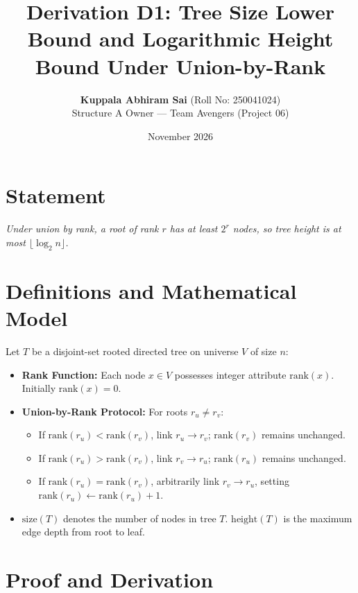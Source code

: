 \documentclass[11pt,a4paper]{article}
\title{\textbf{Derivation D1: Tree Size Lower Bound and Logarithmic Height Bound Under Union-by-Rank}}
\author{\textbf{Kuppala Abhiram Sai} (Roll No: 250041024) \\ Structure A Owner --- Team Avengers (Project 06)}
\date{November 2026}
\begin{document}
\maketitle

\section{Statement}
\textit{Under union by rank, a root of rank $r$ has at least $2^r$ nodes, so tree height is at most $\lfloor \log_2 n \rfloor$.}

\section{Definitions and Mathematical Model}
Let $T$ be a disjoint-set rooted directed tree on universe $V$ of size $n$:
\begin{itemize}
    \item \textbf{Rank Function:} Each node $x \in V$ possesses integer attribute $\text{rank}(x)$. Initially $\text{rank}(x) = 0$.
    \item \textbf{Union-by-Rank Protocol:} For roots $r_u \neq r_v$:
    \begin{itemize}
        \item If $\text{rank}(r_u) < \text{rank}(r_v)$, link $r_u \to r_v$; $\text{rank}(r_v)$ remains unchanged.
        \item If $\text{rank}(r_u) > \text{rank}(r_v)$, link $r_v \to r_u$; $\text{rank}(r_u)$ remains unchanged.
        \item If $\text{rank}(r_u) = \text{rank}(r_v)$, arbitrarily link $r_v \to r_u$, setting $\text{rank}(r_u) \leftarrow \text{rank}(r_u) + 1$.
    \end{itemize}
    \item $\text{size}(T)$ denotes the number of nodes in tree $T$. $\text{height}(T)$ is the maximum edge depth from root to leaf.
\end{itemize}

\section{Proof and Derivation}
\end{document}
